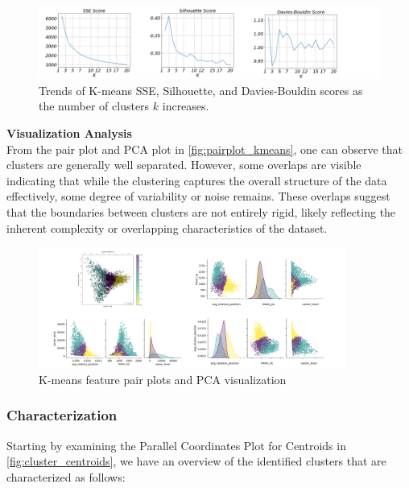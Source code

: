 \begin{figure}[H]
    \centering
    \includegraphics[width=1\textwidth]{images/CLUSTER/k-means/metrics.png}
    \caption{ \small Trends of K-means SSE, Silhouette, and Davies-Bouldin scores as the number of clusters \( k \) increases.}
    \label{fig:metrics_kmeans}
\end{figure}

\noindent
\textbf{Visualization Analysis}\\
From the pair plot and PCA plot in \autoref{fig:pairplot_kmeans}, one can observe that clusters are generally well separated. However, some overlaps are visible indicating that while the clustering captures the overall structure of the data effectively, some degree of variability or noise remains. These overlaps suggest that the boundaries between clusters are not entirely rigid, likely reflecting the inherent complexity or overlapping characteristics of the dataset.

\begin{figure}[H]
\centering
\includegraphics[width=0.9\textwidth]{images/CLUSTER/k-means/pairplot.png}
\caption{ \small K-means feature pair plots and PCA visualization \small }
\label{fig:pairplot_kmeans}
\end{figure}

\subsubsection{Characterization}
Starting by examining the Parallel Coordinates Plot for Centroids in \autoref{fig:cluster_centroids}, we have an overview of the identified clusters that are characterized as follows:

\vspace{-0.2cm}

